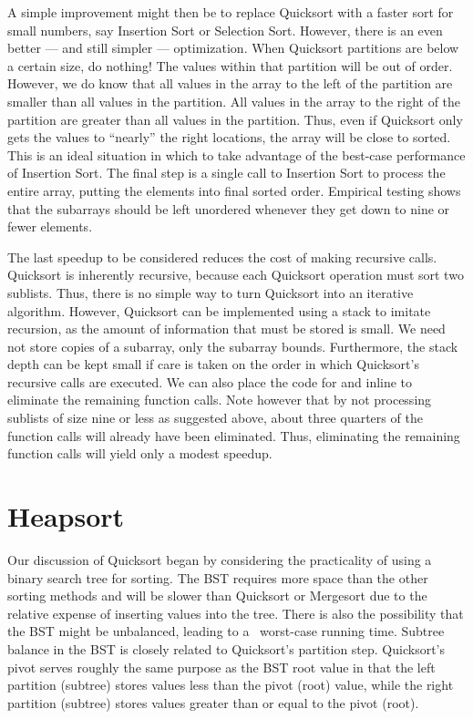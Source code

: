 A simple improvement might then be to replace Quicksort with a faster
sort for small numbers, say
Insertion Sort
or Selection Sort.
However, there is an even better --- and still simpler --- optimization.
When Quicksort partitions are below a certain size, do nothing!
The values within that partition will be out of order.
However, we do know that all values in the array to the left of the
partition are smaller than all values in the partition.
All values in the array to the right of the partition are greater than
all values in the partition.
Thus, even if Quicksort only gets the values to
``nearly'' the right locations, the array will be close to sorted.
This is an ideal situation in which to take advantage of the best-case
performance of Insertion Sort.
The final step is a single call to Insertion Sort to process the
entire array, putting the elements into final sorted order.
Empirical testing shows that the subarrays should be left unordered
whenever they get down to nine or fewer elements.

The last speedup to be considered reduces the cost of making
recursive calls.
Quicksort is inherently recursive, because each Quicksort operation
must sort two sublists.
Thus, there is no simple way to turn Quicksort into an iterative
algorithm.
However, Quicksort can be implemented using a stack
to imitate recursion, as the amount of information that must
be stored is small.
We need not store copies of a subarray, only the subarray bounds.
Furthermore, the stack depth can be kept small if care is taken on
the order in which Quicksort's recursive calls are executed.
We can also place the code for  and 
inline to eliminate the remaining function calls.
Note however that by not processing sublists of size nine or
less as suggested above, about three quarters of the function calls
will already have been eliminated.
Thus, eliminating the remaining function calls will yield only a
modest speedup.

\section{Heapsort}
\label{Heapsort}

Our discussion of Quicksort
began by considering the practicality of
using a binary search tree for sorting.
The BST requires more space than the other sorting methods and will
be slower than Quicksort or Mergesort due to the relative expense of
inserting values into the tree.
There is also the possibility that the BST might be unbalanced,
leading to a \Thetantwo\ worst-case running time.
Subtree balance in the BST is closely related to Quicksort's partition
step.
Quicksort's pivot serves roughly the same purpose as the BST root
value in that the left partition (subtree) stores values less than
the pivot (root) value, while the right partition (subtree) stores
values greater than or equal to the pivot (root).

